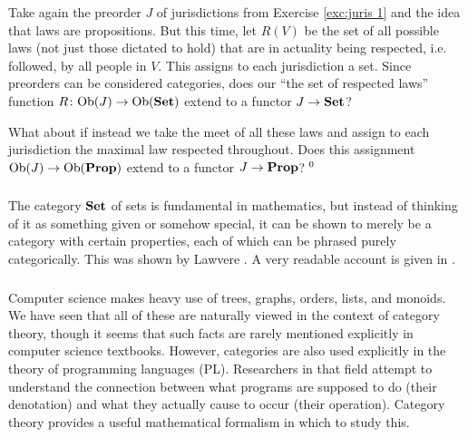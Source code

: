 \begin{exercise}\label{exc:juris 2}
Take again the preorder $J$ of jurisdictions from Exercise \ref{exc:juris 1} and the idea that laws are propositions. But this time, let $R(V)$ be the set of all possible laws (not just those dictated to hold) that are in actuality being respected, i.e. followed, by all people in $V$. This assigns to each jurisdiction a set.
\sexc Since preorders can be considered categories, does our “the set of respected laws” function $R\colon\textnormal{Ob}(J)\rightarrow\textnormal{Ob}({\bf Set})$ extend to a functor $J\rightarrow{\bf Set}$? 
\item What about if instead we take the meet of all these laws and assign to each jurisdiction the maximal law respected throughout. Does this assignment $\textnormal{Ob}(J)\rightarrow\textnormal{Ob}({\bf Prop})$ extend to a functor $J\rightarrow{\bf Prop}$?$~^{\arabic{footnote}}$
\endsexc
\end{exercise}


\subsubsection{}
The category ${\bf Set}$ of sets is fundamental in mathematics, but instead of thinking of it as something given or somehow special, it can be shown to merely be a category with certain properties, each of which can be phrased purely categorically. This was shown by Lawvere \cite{Law}. A very readable account is given in \cite{Le2}.


\subsubsection{}

Computer science makes heavy use of trees, graphs, orders, lists, and monoids. We have seen that all of these are naturally viewed in the context of category theory, though it seems that such facts are rarely mentioned explicitly in computer science textbooks. However, categories are also used explicitly in the theory of programming languages (PL). Researchers in that field attempt to understand the connection between what programs are supposed to do (their denotation) and what they actually cause to occur (their operation). Category theory provides a useful mathematical formalism in which to study this.

